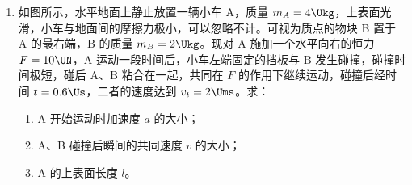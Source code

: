 \documentclass[\gkver]{gaokaozhenti}
\begin{document}
\begin{enumerate}
\item
如图所示，水平地面上静止放置一辆小车 A，质量 $m_{A}=4\Ukg$，上表面光滑，小车与地面间的摩擦力极小，可以忽略不计。可视为质点的物块 B 置于 A 的最右端，B 的质量 $m_{B}=2\Ukg$。现对 A 施加一个水平向右的恒力 $F=10\UN$，A 运动一段时间后，小车左端固定的挡板与 B 发生碰撞，碰撞时间极短，碰后 A、B 粘合在一起，共同在 $F$ 的作用下继续运动，碰撞后经时间 $t=0.6\Us$，二者的速度达到 $v_{t}=2\Ums$。求：
\begin{enumerate}
	\item
	A 开始运动时加速度 $a$ 的大小；
	\item
	A、B 碰撞后瞬间的共同速度 $v$ 的大小；
	\item
	A 的上表面长度 $l$。
\end{enumerate}
\jdanswer{
\begin{enumerate}
	\item
	$2.5\Umsq$

	\item
	$1\Ums$

	\item
	$0.45\Um$

\end{enumerate}
}


\end{enumerate}
\end{document}
